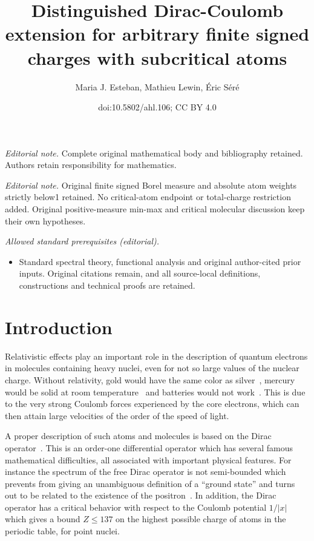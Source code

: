 \documentclass[10pt]{amsart}
\title{Distinguished Dirac-Coulomb extension for arbitrary finite signed charges with subcritical atoms}
\author{Maria J. Esteban, Mathieu Lewin, Éric Séré}
\date{doi:10.5802/ahl.106; CC BY 4.0}
\theoremstyle{definition}
\newcommand\1{{\ensuremath {\mathds 1} }}
\renewcommand{\leq}{\leqslant}
\begin{document}
\maketitle
\noindent\textit{Editorial note.} Complete original mathematical body and bibliography retained. Authors retain responsibility for mathematics.\par\medskip
\noindent\textit{Editorial note.} Original finite signed Borel measure and absolute atom weights strictly below1 retained. No critical-atom endpoint or total-charge restriction added. Original positive-measure min-max and critical molecular discussion keep their own hypotheses.\par\medskip
\noindent\textit{Allowed standard prerequisites (editorial).}\begin{itemize}
\item Standard spectral theory, functional analysis and original author-cited prior inputs. Original citations remain, and all source-local definitions, constructions and technical proofs are retained.
\end{itemize}\medskip
\section{Introduction}



Relativistic effects play an important role in the description of quantum electrons in molecules containing heavy nuclei, even for not so large values of the nuclear charge. Without relativity, gold would have the same color as silver~\cite{GlaAmb-10}, mercury would be solid at room temperature~\cite{CalPahWorSch-13} and batteries would not work~\cite{ZalPyy-11}. This is due to the very strong Coulomb forces experienced by the core electrons, which can then attain large velocities of the order of the speed of light.

A proper description of such atoms and molecules is based on the Dirac operator~\cite{EstLewSer-08,Thaller}. This is an order-one differential operator which has several famous mathematical difficulties, all associated with important physical features. For instance the spectrum of the free Dirac operator is not semi-bounded which prevents from giving an unambiguous definition of a ``ground state'' and turns out to be related to the existence of the positron~\cite{EstLewSer-08}. In addition, the Dirac operator has a critical behavior with respect to the Coulomb potential $1/|x|$ which gives a bound $Z\leq 137$ on the highest possible charge of atoms in the periodic table, for point nuclei.
\end{document}
